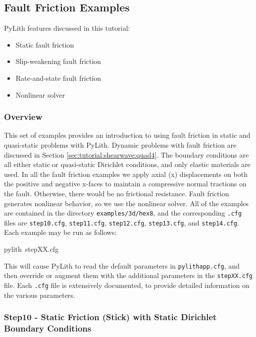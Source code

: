 
\subsection{\label{sec:Tutorial-3d-hex8-friction}Fault Friction Examples}

PyLith features discussed in this tutorial:
\begin{itemize}
\item Static fault friction
\item Slip-weakening fault friction
\item Rate-and-state fault friction
\item Nonlinear solver
\end{itemize}

\subsubsection{Overview}

This set of examples provides an introduction to using fault friction
in static and quasi-static problems with PyLith. Dynamic problems
with fault friction are discussed in Section \vref{sec:tutorial:shearwave:quad4}.
The boundary conditions are all either static or quasi-static Dirichlet
conditions, and only elastic materials are used. In all the fault
friction examples we apply axial (x) displacements on both the positive
and negative x-faces to maintain a compressive normal tractions on
the fault. Otherwise, there would be no frictional resistance. Fault
friction generates nonlinear behavior, so we use the nonlinear solver.
All of the examples are contained in the directory \texttt{examples/3d/hex8},
and the corresponding \texttt{.cfg} files are \texttt{step10.cfg},
\texttt{step11.cfg}, \texttt{step12.cfg}, \texttt{step13.cfg}, and
\texttt{step14.cfg}. Each example may be run as follows:
\begin{lyxcode}
pylith~stepXX.cfg
\end{lyxcode}
This will cause PyLith to read the default parameters in \texttt{pylithapp.cfg},
and then override or augment them with the additional parameters in
the \texttt{stepXX.cfg} file. Each \texttt{.cfg} file is extensively
documented, to provide detailed information on the various parameters.


\subsubsection{Step10 - Static Friction (Stick) with Static Dirichlet Boundary Conditions}

